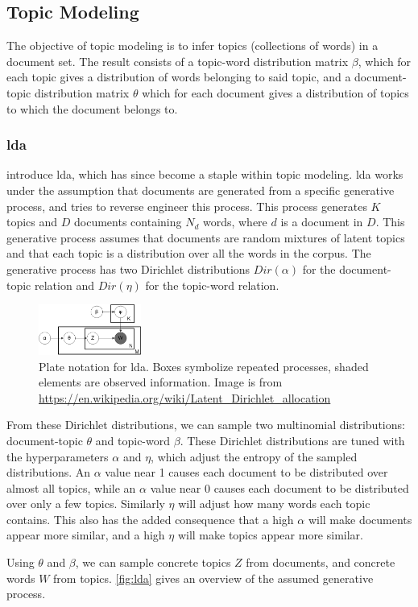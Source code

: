 \subsection{Topic Modeling}\label{subsec:topicModelling}
The objective of topic modeling is to infer topics (collections of words) in a document set.
The result consists of a topic-word distribution matrix $\beta$, which for each topic gives a distribution of words belonging to said topic, and a document-topic distribution matrix $\theta$ which for each document gives a distribution of topics to which the document belongs to.

\subsubsection{\acrlong{lda}}\label{subsec:lda} 
\citeauthor{lda} \cite{lda} introduce \gls{lda}, which has since become a staple within topic modeling.
\gls{lda} works under the assumption that documents are generated from a specific generative process, and tries to reverse engineer this process.
This process generates $K$ topics and $D$ documents containing $N_{d}$ words, where $d$ is a document in $D$.
This generative process assumes that documents are random mixtures of latent topics and that each topic is a distribution over all the words in the corpus.
The generative process has two Dirichlet distributions $Dir(\alpha)$ for the document-topic relation and $Dir(\eta)$ for the topic-word relation.

\begin{figure}[h]
	\centering
	\includegraphics[width=0.3\textwidth]{figures/Smoothed_LDA.png}
	\caption{Plate notation for \gls{lda}. Boxes symbolize repeated processes, shaded elements are observed information. Image is from \url{https://en.wikipedia.org/wiki/Latent_Dirichlet_allocation}}
	\label{fig:lda}
\end{figure}
From these Dirichlet distributions, we can sample two multinomial distributions: document-topic $\theta$ and topic-word $\beta$.
These Dirichlet distributions are tuned with the hyperparameters $\alpha$ and $\eta$, which adjust the entropy of the sampled distributions.
An $\alpha$ value near 1 causes each document to be distributed over almost all topics, while an $\alpha$ value near 0 causes each document to be distributed over only a few topics.
Similarly $\eta$ will adjust how many words each topic contains.
This also has the added consequence that a high $\alpha$ will make documents appear more similar, and a high $\eta$ will make topics appear more similar.

Using $\theta$ and $\beta$, we can sample concrete topics $Z$ from documents, and concrete words $W$ from topics.
\autoref{fig:lda} gives an overview of the assumed generative process.
